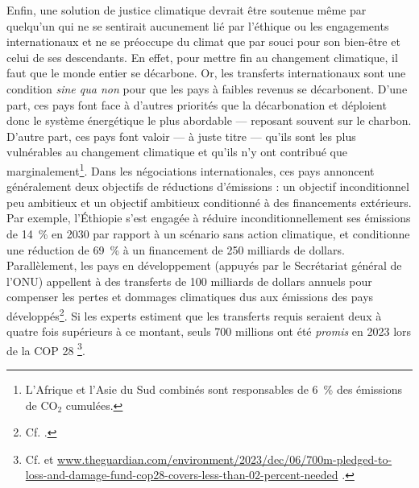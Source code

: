 \documentclass[a5paper,french,openany]{memoir}
\begin{document}
Enfin, une solution de justice climatique devrait être soutenue même par quelqu'un qui ne se sentirait aucunement lié par l'éthique ou les engagements internationaux et ne se préoccupe du climat que par souci pour  
son bien-être et celui de ses descendants. En effet, pour mettre fin au changement climatique, %
il faut que le monde entier se décarbone. 
Or, les transferts internationaux sont une condition \textit{sine qua non} pour que les pays à faibles revenus se décarbonent. D'une part, ces pays font face à d'autres priorités que la décarbonation et déploient donc le système énergétique le plus abordable --- reposant souvent sur le charbon. D'autre part, ces pays font valoir --- à juste titre --- qu'ils sont les plus vulnérables au changement climatique et qu'ils n'y ont contribué que marginalement\footnote{L'Afrique et l'Asie du Sud combinés sont responsables de 6~\% des émissions de CO$_\text{2}$ cumulées. %
}. Dans les négociations internationales, ces pays annoncent généralement deux objectifs de réductions d'émissions : un objectif inconditionnel peu ambitieux et un objectif ambitieux conditionné à des financements extérieurs. Par exemple, l'Éthiopie s'est engagée à réduire inconditionnellement ses émissions de 14~\% en 2030 par rapport à un scénario sans action climatique, et conditionne une réduction de 69~\% à un financement de 250 milliards de dollars. %
Parallèlement, les pays en développement (appuyés par le Secrétariat général de l'ONU) appellent à des transferts de 100 milliards de dollars annuels pour compenser les pertes et dommages climatiques dus aux émissions des pays développés\footnote{Cf. \cite{tc_proposal_2023,sgnu_bridgetown_2023}.}. Si les experts estiment que les transferts requis seraient deux à quatre fois supérieurs à ce montant, seuls 700 millions ont été \textit{promis} en 2023 lors de la COP 28%
\footnote{Cf. \cite{songwe_climate_2023,markandya_integrated_2019,robinson_valuing_2021} et \href{https://www.theguardian.com/environment/2023/dec/06/700m-pledged-to-loss-and-damage-fund-cop28-covers-less-than-02-percent-needed}{www.theguardian.com/environment/2023/dec/06/700m-pledged-to-loss-and-damage-fund-cop28-covers-less-than-02-percent-needed}%
.}.
\end{document}
